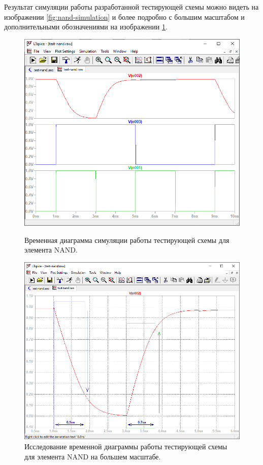 %
Результат симуляции работы разработанной тестирующей схемы можно видеть на
изображении \ref{fig:nand-simulation} и более подробно с большим масштабом и
дополнительными обозначениями на изображении \ref{fig:nand-simulation-inspect}.
\begin{figure}[htb]
    \centering
    \begin{minipage}[b]{0.4\textwidth}
        \centering
        \includegraphics[width=\textwidth]{res/nand_simulation.png}
        \caption{Временная диаграмма симуляции работы тестирующей схемы для элемента NAND.}
        \label{fig:nand-simulation}
    \end{minipage}
    \hfill
    \begin{minipage}[b]{0.55\textwidth}
        \centering
        \includegraphics[width=\textwidth]{res/nand_simulation-inspect-level.png}
        \caption{Исследование временной диаграммы работы тестирующей схемы для элемента NAND на большем масштабе.}
        \label{fig:nand-simulation-inspect}
    \end{minipage}
\end{figure}

